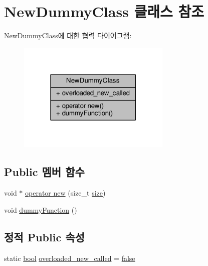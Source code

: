 \hypertarget{class_new_dummy_class}{}\section{New\+Dummy\+Class 클래스 참조}
\label{class_new_dummy_class}


New\+Dummy\+Class에 대한 협력 다이어그램\+:
\nopagebreak
\begin{figure}[H]
\begin{center}
\leavevmode
\includegraphics[width=207pt]{class_new_dummy_class__coll__graph}
\end{center}
\end{figure}
\subsection*{Public 멤버 함수}
\begin{DoxyCompactItemize}
\item 
void $\ast$ \hyperlink{class_new_dummy_class_a205ed048fdf5259c2e8e0cb60ee8f719}{operator new} (size\+\_\+t \hyperlink{gst__avb__playbin_8c_a439227feff9d7f55384e8780cfc2eb82}{size})
\item 
void \hyperlink{class_new_dummy_class_a9697c9dc0e25f0799385ab8bce838aff}{dummy\+Function} ()
\end{DoxyCompactItemize}
\subsection*{정적 Public 속성}
\begin{DoxyCompactItemize}
\item 
static \hyperlink{avb__gptp_8h_af6a258d8f3ee5206d682d799316314b1}{bool} \hyperlink{class_new_dummy_class_aa955ae00a8b850c9ef345f0e76e36699}{overloaded\+\_\+new\+\_\+called} = \hyperlink{avb__gptp_8h_af6a258d8f3ee5206d682d799316314b1ae9de385ef6fe9bf3360d1038396b884c}{false}
\end{DoxyCompactItemize}


